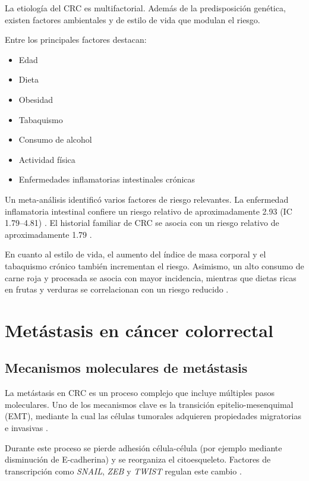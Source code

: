 \documentclass[11pt]{article}
\begin{document}
La etiología del CRC es multifactorial. Además de la predisposición genética, existen factores ambientales y de estilo de vida que modulan el riesgo.

Entre los principales factores destacan:

\begin{itemize}
\item Edad
\item Dieta
\item Obesidad
\item Tabaquismo
\item Consumo de alcohol
\item Actividad física
\item Enfermedades inflamatorias intestinales crónicas
\end{itemize}

Un meta-análisis identificó varios factores de riesgo relevantes. La enfermedad inflamatoria intestinal confiere un riesgo relativo de aproximadamente 2.93 (IC 1.79--4.81) \cite{ref7}. El historial familiar de CRC se asocia con un riesgo relativo de aproximadamente 1.79 \cite{ref7}.

En cuanto al estilo de vida, el aumento del índice de masa corporal y el tabaquismo crónico también incrementan el riesgo. Asimismo, un alto consumo de carne roja y procesada se asocia con mayor incidencia, mientras que dietas ricas en frutas y verduras se correlacionan con un riesgo reducido \cite{ref7}.

\section{Metástasis en cáncer colorrectal}

\subsection{Mecanismos moleculares de metástasis}

La metástasis en CRC es un proceso complejo que incluye múltiples pasos moleculares. Uno de los mecanismos clave es la transición epitelio-mesenquimal (EMT), mediante la cual las células tumorales adquieren propiedades migratorias e invasivas \cite{ref8}.

Durante este proceso se pierde adhesión célula-célula (por ejemplo mediante disminución de E-cadherina) y se reorganiza el citoesqueleto. Factores de transcripción como \textit{SNAIL}, \textit{ZEB} y \textit{TWIST} regulan este cambio \cite{ref8}.
\end{document}
